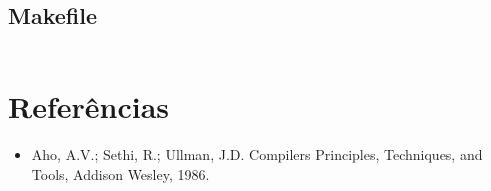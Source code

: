 \documentclass[a4paper,12pt]{report}
\begin{document}
\subsection{Makefile}

\begin{mdframed}[linecolor=black, leftline=false, rightline=false, backgroundcolor=gray!20!white]
    \inputminted[linenos, fontsize=\footnotesize]{text}{../src/Makefile}
\end{mdframed}

\section{Referências}

\begin{itemize}
 \item Aho, A.V.; Sethi, R.; Ullman, J.D. Compilers Principles, Techniques, and
 Tools, Addison Wesley, 1986.
\end{itemize}
\end{document}
